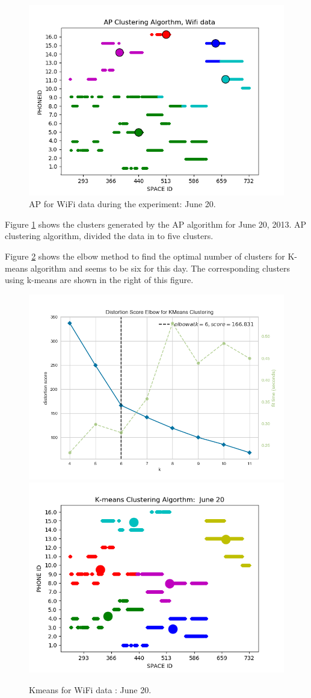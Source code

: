 \begin{figure}[!h]
    \centering
    \includegraphics[width = 10 cm]{image/Chapters/Chapter6/APJune20.png}
    \caption{ AP for WiFi data during the experiment: June 20.}
    \label{APUjoneday}
\end{figure}


Figure \ref{APUjoneday} shows the clusters generated by the AP algorithm for June 20, 2013. AP clustering algorithm, divided the data in to five clusters.


Figure \ref{elbowkwifi} shows the elbow method to find the optimal number of clusters for K-means algorithm and seems to be six for this day. The corresponding clusters using k-means are shown in the right of this figure. %


\begin{figure}[!h]
    \centering
    \includegraphics[width = 7.5 cm]{image/Chapters/Chapter6/elbowDay20.png}\hfill
     \includegraphics[width = 7.5 cm]{image/Chapters/Chapter6/kmeansJun20.png}
    \\[\smallskipamount]    
    \caption{Kmeans for WiFi data : June 20.}
    \label{elbowkwifi}
\end{figure}







